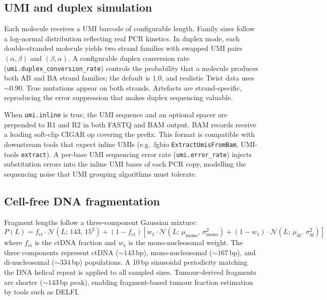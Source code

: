 \subsection{UMI and duplex simulation}

Each molecule receives a UMI barcode of configurable length.
Family sizes follow a log-normal distribution reflecting real PCR kinetics.
In duplex mode\autocite{schmitt2012duplex}, each double-stranded molecule yields two strand families with swapped UMI pairs $(\alpha,\beta)$ and $(\beta,\alpha)$.
A configurable duplex conversion rate (\texttt{umi.duplex\_conversion\_rate}) controls the probability that a molecule produces both AB and BA strand families; the default is 1.0, and realistic Twist data uses ${\sim}0.90$.
True mutations appear on both strands.
Artefacts are strand-specific, reproducing the error suppression that makes duplex sequencing valuable.

When \texttt{umi.inline} is true, the UMI sequence and an optional spacer are prepended to R1 and R2 in both FASTQ and BAM output.
BAM records receive a leading soft-clip CIGAR op covering the prefix.
This format is compatible with downstream tools that expect inline UMIs (e.g.\ fgbio \texttt{ExtractUmisFromBam}, UMI-tools \texttt{extract}).
A per-base UMI sequencing error rate (\texttt{umi.error\_rate}) injects substitution errors into the inline UMI bases of each PCR copy, modelling the sequencing noise that UMI grouping algorithms must tolerate.

\subsection{Cell-free DNA fragmentation}
\label{sec:cfdna}

Fragment lengths follow a three-component Gaussian mixture:
\begin{equation}
  P(L) = f_\text{ct} \cdot \mathcal{N}(L;\, 143,\, 15^2) + (1 - f_\text{ct})\left[w_1 \cdot \mathcal{N}(L;\, \mu_\text{mono},\, \sigma_\text{mono}^2) + (1 - w_1) \cdot \mathcal{N}(L;\, \mu_\text{di},\, \sigma_\text{di}^2)\right]
  \label{eq:cfdna}
\end{equation}
where $f_\text{ct}$ is the ctDNA fraction and $w_1$ is the mono-nucleosomal weight.
The three components represent ctDNA (${\sim}143$\,bp), mono-nucleosomal (${\sim}167$\,bp), and di-nucleosomal (${\sim}334$\,bp) populations.
A 10\,bp sinusoidal periodicity matching the DNA helical repeat is applied to all sampled sizes\autocite{snyder2016cfdna_nucleosome}.
Tumour-derived fragments are shorter (${\sim}143$\,bp peak)\autocite{lo2010cfdna}, enabling fragment-based tumour fraction estimation by tools such as DELFI.

